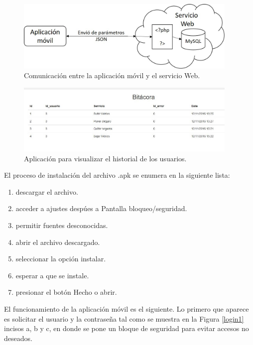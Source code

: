 \begin{figure}[H]
\centering
\includegraphics[width=0.95\textwidth]{metodologia/webservice.jpg}
\caption{Comunicación entre la aplicación móvil y el servicio Web.}
\label{webservice}
\end{figure}
%

\begin{figure}[H]
\centering
\includegraphics[width=0.95\textwidth]{aplicacion/bitacoraweb.jpg}
\caption{Aplicación para visualizar el historial de los usuarios.}
\label{bitacoraweb}
\end{figure}


El proceso de instalación del archivo .apk se enumera en la siguiente lista: \\
\begin{enumerate}
\item descargar el archivo.
\item acceder a ajustes despúes a Pantalla bloqueo/seguridad.
\item permitir fuentes desconocidas.
\item abrir el archivo descargado.
\item seleccionar la opción instalar.
\item esperar a que se instale.
\item presionar el botón Hecho o abrir.

\end{enumerate}



El funcionamiento de la aplicación móvil es el siguiente. Lo primero que aparece es solicitar el usuario y la contraseña tal como se muestra en la Figura \ref{login1} incisos a, b y c, en donde se pone un bloque de seguridad para evitar accesos no deseados.

